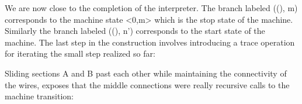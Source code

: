 \documentclass{llncs}
\begin{document}




We are now close to the completion of the interpreter.  The branch labeled
{{((), m)}} corresponds to the machine state {{<0,m>}} which is the stop
state of the machine. Similarly the branch labeled {{((), n')}} corresponds
to the start state of the machine.  The last step in the construction
involves introducing a {{trace}} operation for iterating the small step
realized so far:

\vspace{-20px}
\begin{center}
\end{center}

\noindent
Sliding sections A and B past each other while maintaining the connectivity
of the wires, exposes that the middle connections were really recursive calls
to the machine transition:

\begin{center}
\end{center}  
\end{document}
